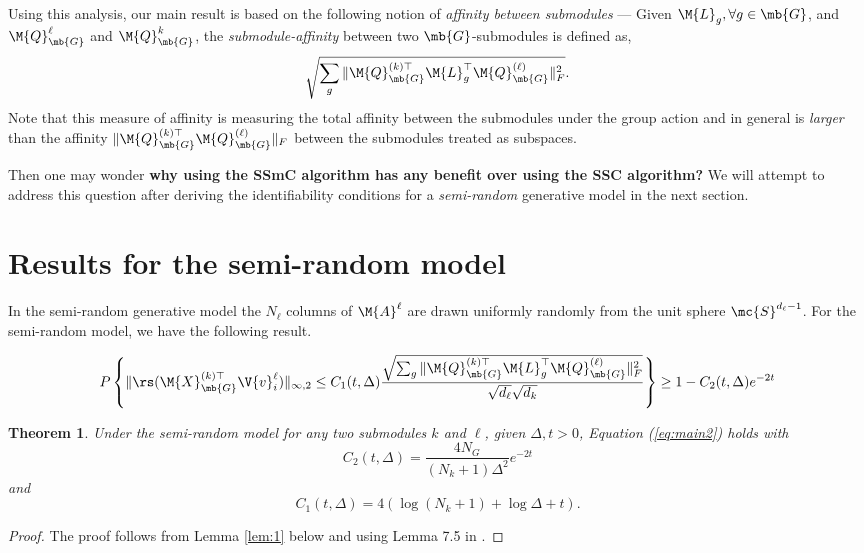 \documentclass[conference]{IEEEtran}
\newtheorem{theorem}{Theorem}[section]
\begin{document}
Using this analysis, our main result is based on the following notion of \emph{affinity between submodules} --- Given $\M{L}_g, \forall g \in \mb{G}$, and $\M{Q}_{\mb{G}}^{\ell}$ and $\M{Q}_{\mb{G}}^{k}$, the \emph{submodule-affinity} between two $\mb{G}$-submodules is defined as,
\begin{align}
\sqrt{\sum_{g}\|\M{Q}_{\mb{G}}^{(k)\top} \M{L}_{g}^{\top} \M{Q}_{\mb{G}}^{(\ell)} \|_{F}^{2}}.
\end{align}
Note that this measure of affinity is measuring the total affinity between the submodules under the group action and in general is \emph{larger} than the affinity $ \|\M{Q}_{\mb{G}}^{(k)\top} \M{Q}_{\mb{G}}^{(\ell)} \|_{F}$ between the submodules treated as subspaces. 

Then one may wonder \textbf{why using the SSmC algorithm has any benefit over using the SSC algorithm?} We will attempt to address this question after deriving the identifiability conditions for a \emph{semi-random} generative model in the next section.

\section{Results for the semi-random model}

In the semi-random generative model the $N_\ell$ columns of $\M{A}^\ell$ are drawn uniformly randomly from the unit sphere $\mc{S}^{d_\ell-1}$.  For the semi-random model, we have the following result. 

\begin{figure*}
\begin{align}
\label{eq:main2}
P \left\{ \| \rs(\M{X}_{\mb{G}}^{(k)\top} {\V{v}}_i^\ell)\|_{\infty,2} \leq C_1(t,\Delta) \frac{\sqrt{\sum_{g}\|\M{Q}_{\mb{G}}^{(k)\top} \M{L}_{g}^{\top} \M{Q}_{\mb{G}}^{(\ell)} \|_{F}^{2}}}{\sqrt{d_\ell} \sqrt{d_k}}  \right\} \geq 1 - C_2(t,\Delta) e^{-2t}
\end{align}
\end{figure*}

\begin{theorem}
\label{thm:main}
Under the semi-random model for any two submodules $k$ and $\ell$, given $\Delta, t >0$, Equation (\ref{eq:main2}) holds with $$ C_2(t,\Delta) = \dfrac{4 N_G}{(N_k +1) \Delta^2 } e^{-2t}$$ and $$ C_1(t, \Delta) = 4 (\log(N_k+1) + \log \Delta + t).$$ 
\end{theorem}
\begin{proof}
The proof follows from Lemma \ref{lem:1} below and using Lemma 7.5 in \cite{Soltanolkotabi:2012ia}.
\end{proof}
\end{document}
